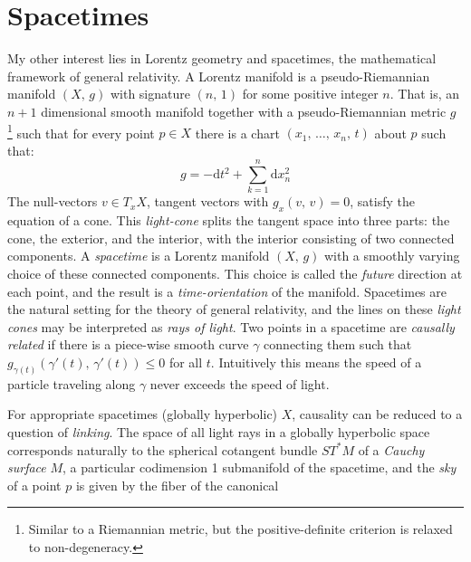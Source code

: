 \documentclass{article}
\begin{document}
    \section{Spacetimes}
        My other interest lies in Lorentz geometry and spacetimes,
        the mathematical framework of general relativity. A Lorentz manifold
        is a pseudo-Riemannian manifold $(X,\,g)$ with signature $(n,\,1)$ for
        some positive integer $n$. That is, an $n+1$ dimensional smooth
        manifold together with a pseudo-Riemannian metric $g$%
        \footnote{
            Similar to a Riemannian metric, but the positive-definite
            criterion is relaxed to non-degeneracy.
        }
        such that for every point $p\in{X}$ there is a chart
        $(x_{1},\,\dots,\,x_{n},\,t)$ about $p$ such that:
        \begin{equation}
            g=-\textrm{d}t^{2}+\sum_{k=1}^{n}\textrm{d}x_{n}^{2}
        \end{equation}
        The null-vectors $v\in{T}_{x}X$, tangent vectors with
        $g_{x}(v,\,v)=0$, satisfy the equation of a cone. This
        \textit{light-cone} splits the tangent space into three parts: the
        cone, the exterior, and the interior, with the interior consisting
        of two connected components. A \textit{spacetime} is a Lorentz manifold
        $(X,\,g)$ with a smoothly varying choice of these connected
        components. This choice is called the \textit{future} direction at
        each point, and the result is a \textit{time-orientation} of the
        manifold. Spacetimes are the natural setting for the theory of
        general relativity, and the lines on these \textit{light cones} may be
        interpreted as \textit{rays of light}. Two points in a spacetime are
        \textit{causally related} if there is a piece-wise smooth curve
        $\gamma$ connecting them such that
        $g_{\gamma(t)}(\gamma'(t),\,\gamma'(t))\leq{0}$ for all $t$.
        Intuitively this means the speed of a particle traveling along $\gamma$
        never exceeds the speed of light.
        \par\hfill\par
        For appropriate spacetimes (globally hyperbolic) $X$, causality can be
        reduced to a question of \textit{linking}. The space of all light rays
        in a globally hyperbolic space corresponds naturally to the
        spherical cotangent bundle $ST^{*}M$ of a \textit{Cauchy surface} $M$,
        a particular codimension 1 submanifold of the spacetime, and the
        \textit{sky} of a point $p$ is given by the fiber of the canonical
\end{document}
